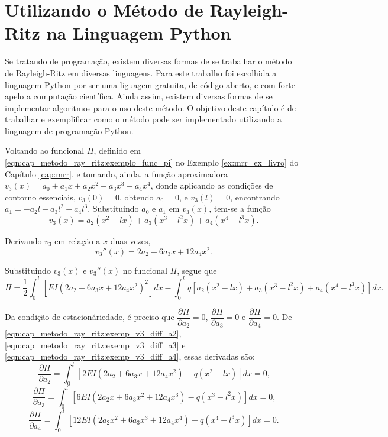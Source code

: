 \documentclass[
	12pt,				%
	openright,			%
    twoside,			%
	a4paper,			%
	english,			%
	french,				%
	spanish,			%
	brazil				%
	]{abntex2}
\numberwithin{lema}{chapter}
\numberwithin{teorema}{chapter}
\numberwithin{definicao}{chapter}
\numberwithin{exemplo}{chapter}
\numberwithin{figure}{chapter}
\begin{document}


\chapter{Utilizando o Método de Rayleigh-Ritz na Linguagem Python}

{\color{red}Se tratando de programação, existem diversas formas de se trabalhar o método de Rayleigh-Ritz em diversas linguagens. Para este trabalho foi escolhida a linguagem Python por ser uma liguagem gratuita, de código aberto, e com forte apelo a computação científica. Ainda assim, existem diversas formas de se implementar algoritmos para o uso deste método. O objetivo deste capítulo é de trabalhar e exemplificar como o método pode ser implementado utilizando a linguagem de programação Python.}

Voltando ao funcional $\Pi$, definido em \eqref{eqn:cap_metodo_ray_ritz:exemplo_func_pi} no Exemplo \ref{ex:mrr_ex_livro} do Capítulo \ref{cap:mrr}, e tomando, ainda, a função aproximadora $v_3(x)=a_0+a_1 x + a_2 x^2 + a_3 x^3 + a_4 x^4$, donde aplicando as condições de contorno essenciais, $v_3(0)=0$, obtendo $a_0=0$, e $v_3(l)=0$, encontrando $a_1=-a_2l-a_3l^2-a_4l^3$. Substituindo $a_0$ e $a_1$ em $v_3(x)$, tem-se a função
$$
	v_3(x)=
	a_2 (x^2 - lx)
	+
	a_3 (x^3 - l^2x)
	+
	a_4 (x^4 - l^3x)
	\text{.}
$$

Derivando $v_3$ em relação a $x$ duas vezes,
$$
	v_3''(x)=
	2a_2
	+
	6a_3 x
	+
	12a_4 x^2
	\text{.}
$$
	
Substituindo $v_3(x)$ e $v_3''(x)$ no funcional $\Pi$, segue que
$$
	\Pi = \frac{1}{2} \int_0^l \left [
    	EI(2a_2+6a_3x+12a_4x^2)^2
	\right ] dx
	-
	\int_0^l q \left [
		a_2(x^2 - lx)
		+
		a_3(x^3 - l^2x)
		+
		a_4(x^4 - l^3x)
	\right ] dx
	\text{.}
$$

Da condição de estacionáriedade, é preciso que $\dfrac{\partial\Pi}{\partial a_2}=0$, $\dfrac{\partial\Pi}{\partial a_3}=0$ e $\dfrac{\partial \Pi}{\partial a_4}=0$. De \eqref{eqn:cap_metodo_ray_ritz:exemp_v3_diff_a2}, \eqref{eqn:cap_metodo_ray_ritz:exemp_v3_diff_a3} e \eqref{eqn:cap_metodo_ray_ritz:exemp_v3_diff_a4}, essas derivadas são:
\begin{equation}
	\label{eqn:cap_mrr_python:do_ex1_partial_pi_a2}
	\frac{\partial \Pi}{\partial a_2}
	=
	\int_0^l \left [
		2EI(2a_2 + 6a_3x + 12a_4x^2)
		-
		q(x^2 - lx)
	\right ] dx
	= 0
	\text{,}
\end{equation}
\begin{equation}
	\label{eqn:cap_mrr_python:do_ex1_partial_pi_a3}
	\frac{\partial \Pi}{\partial a_3}
	=
	\int_0^l \left [
		6EI(2a_2x + 6a_3x^2 + 12a_4x^3)
		-
		q(x^3 - l^2x)
	\right ] dx
	= 0
	\text{,}
\end{equation}
\begin{equation}
	\label{eqn:cap_mrr_python:do_ex1_partial_pi_a4}
	\frac{\partial \Pi}{\partial a_4}
	=
	\int_0^l \left [
		12EI(2a_2x^2 + 6a_3x^3 + 12a_4x^4)
		-
		q(x^4 - l^3x)
	\right ] dx
	= 0
	\text{.}
\end{equation}
\end{document}
